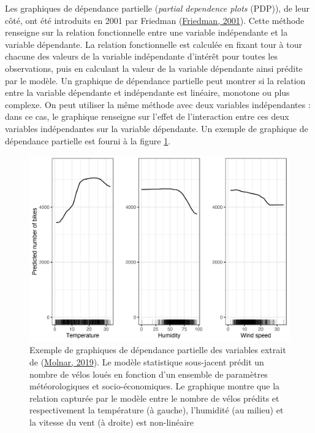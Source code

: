 \documentclass[12pt,twoside]{reedthesis}
\begin{document}
Les graphiques de dépendance partielle (\emph{partial dependence plots} (PDP)), de leur côté, ont été introduits en 2001 par Friedman (\protect\hyperlink{ref-friedman_greedy_2001}{Friedman, 2001}). Cette méthode renseigne sur la relation fonctionnelle entre une variable indépendante et la variable dépendante. La relation fonctionnelle est calculée en fixant tour à tour chacune des valeurs de la variable indépendante d'intérêt pour toutes les observations, puis en calculant la valeur de la variable dépendante ainsi prédite par le modèle. Un graphique de dépendance partielle peut montrer si la relation entre la variable dépendante et indépendante est linéaire, monotone ou plus complexe. On peut utiliser la même méthode avec deux variables indépendantes : dans ce cas, le graphique renseigne sur l'effet de l'interaction entre ces deux variables indépendantes sur la variable dépendante. Un exemple de graphique de dépendance partielle est fourni à la figure \ref{fig:example-pdp}.\\
\begin{figure}

{\centering \includegraphics[width=0.7\linewidth]{figure/pdp-bike-1} 

}

\caption[Exemple de graphique de dépendance partielle des variables]{Exemple de graphiques de dépendance partielle des variables extrait de (\protect\hyperlink{ref-molnar_interpretable_2019}{Molnar, 2019}). Le modèle statistique sous-jacent prédit un nombre de vélos loués en fonction d'un ensemble de paramètres météorologiques et socio-économiques. Le graphique montre que la relation capturée par le modèle entre le nombre de vélos prédits et respectivement la température (à gauche), l'humidité (au milieu) et la vitesse du vent (à droite) est non-linéaire}\label{fig:example-pdp}
\end{figure}
\end{document}
